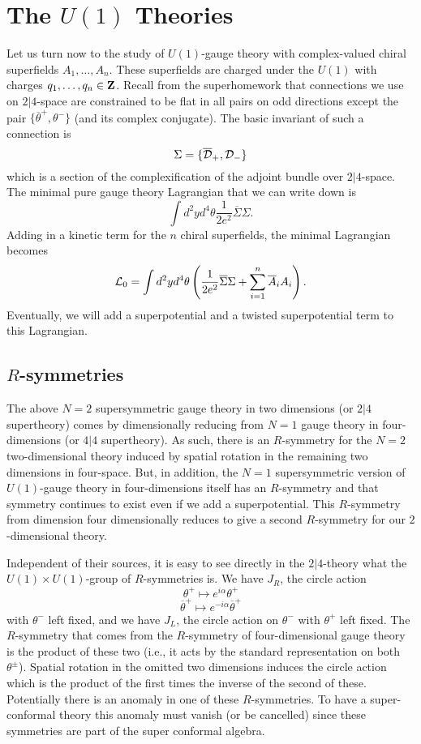\section{The $U(1)$ Theories}

Let us turn now to the  study of $U(1)$-gauge theory with complex-valued
chiral superfields $A_1,\ldots,A_n$. These superfields are charged
under the $U(1)$ with charges $q_1,\ldots,q_n\in {\bf Z}$.
Recall from the superhomework that connections we use on $2|4$-space are
constrained to be flat in all pairs on odd directions except the pair
$\{\overline\theta^+,\theta^-\}$ (and its complex conjugate).
The basic invariant of such a connection is
$$\Sigma=\{\overline{\cal D}_+,{\cal D}_-\}$$
which is a section of the complexification of the adjoint bundle over
$2|4$-space.
The minimal pure gauge theory Lagrangian that we can write down is
$$\int d^2yd^4\theta\frac{1}{2e^2}\overline\Sigma \Sigma.$$
Adding in a kinetic term for
the $n$ chiral superfields, the minimal Lagrangian becomes
\begin{equation}\label{minlag}
{\cal L}_0=\int d^2yd^4\theta\left(\frac{1}{2e^2}\overline\Sigma
\Sigma+\sum_{i=1}^n\overline A_iA_i\right).
\end{equation}
Eventually, we will add a superpotential and a twisted superpotential
term to this Lagrangian.


\subsection{$R$-symmetries}
The above
$N=2$ supersymmetric gauge theory in two dimensions (or $2|4$ supertheory)
comes by dimensionally reducing from $N=1$ gauge theory in
four-dimensions (or $4|4$ supertheory). As such, there is an
$R$-symmetry for the $N=2$ two-dimensional theory induced by spatial
rotation in the remaining two dimensions in four-space.
But, in addition, the $N=1$ supersymmetric version of
$U(1)$-gauge theory in four-dimensions itself has an $R$-symmetry and
that symmetry continues to exist even if we add a superpotential.
This $R$-symmetry from dimension four dimensionally reduces to give a
second $R$-symmetry for our $2$-dimensional theory.

Independent of their sources, it is easy to see directly in the
$2|4$-theory what the $U(1)\times U(1)$-group of $R$-symmetries is.
We have $J_R$, the circle action
$$\theta^+\mapsto e^{i\alpha}\theta^+$$
$$\overline\theta^+\mapsto e^{-i\alpha}\overline\theta^+$$
with $\theta^-$ left fixed, and we have $J_L$, the circle action on
$\theta^-$ with $\theta^+$ left fixed. The $R$-symmetry that comes
from the $R$-symmetry of four-dimensional gauge theory is the product
of these two (i.e., it acts by the standard representation on both
$\theta^\pm$). Spatial rotation in the omitted two dimensions induces the
circle action which is the
product of the first times the inverse of the second of these.
Potentially there is an anomaly in one of these $R$-symmetries. To
have a super-conformal theory this anomaly must vanish (or be
cancelled) since these symmetries are part of the super conformal
algebra.

